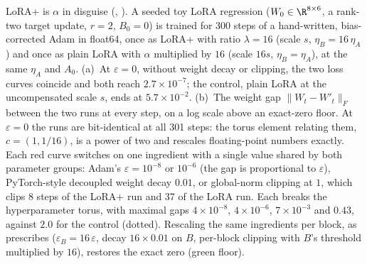 LoRA+ is $\alpha$ in disguise (, ). A seeded toy LoRA regression
($W_0\in\R^{8\times6}$, a rank-two target update, $r=2$, $B_0=0$) is trained for 300 steps of a hand-written,
bias-corrected Adam in float64, once as LoRA+ with ratio $\lambda=16$ (scale $s$, $\eta_B=16\,\eta_A$) and once as plain
LoRA with $\alpha$ multiplied by $16$ (scale $16s$, $\eta_B=\eta_A$), at the same $\eta_A$ and $A_0$. (a)~At
$\varepsilon=0$, without weight decay or clipping, the two loss curves coincide and both reach $2.7\times10^{-7}$; the
control, plain LoRA at the uncompensated scale $s$, ends at $5.7\times10^{-2}$. (b)~The weight gap
$\lVert W_t-W'_t\rVert_F$ between the two runs at every step, on a log scale above an exact-zero floor. At
$\varepsilon=0$ the runs are bit-identical at all 301 steps: the torus element relating them, $c=(1,1/16)$, is a power
of two and rescales floating-point numbers exactly. Each red curve switches on one ingredient with a single value shared
by both parameter groups: Adam's $\varepsilon=10^{-8}$ or $10^{-6}$ (the gap is proportional to $\varepsilon$),
PyTorch-style decoupled weight decay $0.01$, or global-norm clipping at $1$, which clips 8 steps of the LoRA+ run and 37
of the LoRA run. Each breaks the hyperparameter torus, with maximal gaps $4\times10^{-8}$, $4\times10^{-6}$,
$7\times10^{-3}$ and $0.43$, against $2.0$ for the control (dotted). Rescaling the same ingredients per block, as
 prescribes ($\varepsilon_B=16\,\varepsilon$, decay $16\times0.01$ on $B$, per-block clipping
with $B$'s threshold multiplied by $16$), restores the exact zero (green floor).
